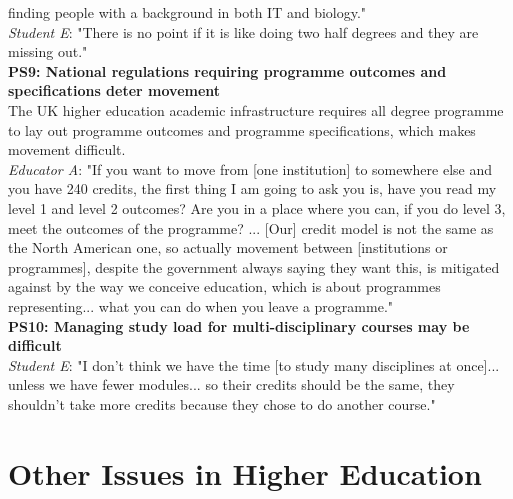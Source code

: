 finding people with a background in both IT and biology."\\
\textit{Student E}: "There is no point if it is like doing two half degrees and they are missing out."
\vspace{0.25cm}\\
\textbf{PS9: National regulations requiring programme outcomes and specifications deter movement}\\
The UK higher education academic infrastructure requires all degree programme to lay out 
programme outcomes and programme specifications, which makes movement difficult.\\
\textit{Educator A}: "If you want to move from [one institution] to somewhere else and you have 240 credits, 
the first thing I am going to ask you is, have you read my level 1 and level 2 outcomes? Are you 
in a place where you can, if you do level 3, meet the outcomes of the programme? ... 
[Our] credit model is not the same as the North American one, so actually movement 
between [institutions or programmes], despite the government always saying they want this, 
is mitigated against by the way we conceive education, which is about programmes representing... 
what you can do when you leave a programme."
\vspace{0.25cm}\\
\textbf{PS10: Managing study load for multi-disciplinary courses may be difficult}\\
\textit{Student E}: "I don't think we have the time [to study many disciplines at once]... unless 
we have fewer modules... so their credits should be the same, they shouldn't take more credits 
because they chose to do another course."

\section{Other Issues in Higher Education}

